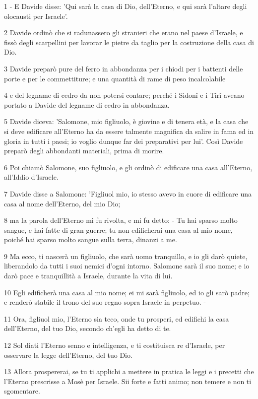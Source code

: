 \par 1 - E Davide disse: 'Qui sarà la casa di Dio, dell'Eterno, e qui sarà l'altare degli olocausti per Israele'.
\par 2 Davide ordinò che si radunassero gli stranieri che erano nel paese d'Israele, e fissò degli scarpellini per lavorar le pietre da taglio per la costruzione della casa di Dio.
\par 3 Davide preparò pure del ferro in abbondanza per i chiodi per i battenti delle porte e per le commettiture; e una quantità di rame di peso incalcolabile
\par 4 e del legname di cedro da non potersi contare; perché i Sidonî e i Tirî aveano portato a Davide del legname di cedro in abbondanza.
\par 5 Davide diceva: 'Salomone, mio figliuolo, è giovine e di tenera età, e la casa che si deve edificare all'Eterno ha da essere talmente magnifica da salire in fama ed in gloria in tutti i paesi; io voglio dunque far dei preparativi per lui'. Così Davide preparò degli abbondanti materiali, prima di morire.
\par 6 Poi chiamò Salomone, suo figliuolo, e gli ordinò di edificare una casa all'Eterno, all'Iddio d'Israele.
\par 7 Davide disse a Salomone: 'Figliuol mio, io stesso avevo in cuore di edificare una casa al nome dell'Eterno, del mio Dio;
\par 8 ma la parola dell'Eterno mi fu rivolta, e mi fu detto: - Tu hai sparso molto sangue, e hai fatte di gran guerre; tu non edificherai una casa al mio nome, poiché hai sparso molto sangue sulla terra, dinanzi a me.
\par 9 Ma ecco, ti nascerà un figliuolo, che sarà uomo tranquillo, e io gli darò quiete, liberandolo da tutti i suoi nemici d'ogni intorno. Salomone sarà il suo nome; e io darò pace e tranquillità a Israele, durante la vita di lui.
\par 10 Egli edificherà una casa al mio nome; ei mi sarà figliuolo, ed io gli sarò padre; e renderò stabile il trono del suo regno sopra Israele in perpetuo. -
\par 11 Ora, figliuol mio, l'Eterno sia teco, onde tu prosperi, ed edifichi la casa dell'Eterno, del tuo Dio, secondo ch'egli ha detto di te.
\par 12 Sol diati l'Eterno senno e intelligenza, e ti costituisca re d'Israele, per osservare la legge dell'Eterno, del tuo Dio.
\par 13 Allora prospererai, se tu ti applichi a mettere in pratica le leggi e i precetti che l'Eterno prescrisse a Mosè per Israele. Sii forte e fatti animo; non temere e non ti sgomentare.
